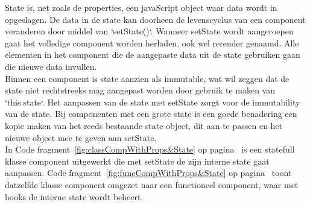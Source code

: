 State is, net zoals de properties, een javaScript object waar data wordt in opgeslagen. De data in de state kan doorheen de levenscyclus van een component veranderen door middel van `setState()`. Wanneer setState wordt aangeroepen gaat het volledige component worden herladen, ook wel rerender genaamd. Alle elementen in het component die de aangepaste data uit de state gebruiken gaan die nieuwe data invullen.\\
Binnen een component is state aanzien als immutable, wat wil zeggen dat de state niet rechtstreeks mag aangepast worden door gebruik te maken van `this.state`. Het aanpassen van de state met setState zorgt voor de immutability van de state. Bij componenten met een grote state is een goede benadering een kopie maken van het reeds bestaande state object, dit aan te passen en het nieuwe object mee te geven aan setState.\\
In Code fragment~\ref{fig:classCompWithProps&State} op pagina~\pageref{fig:classCompWithProps&State} is een statefull klasse component uitgewerkt die met setState de zijn interne state gaat aanpassen. Code fragment~\ref{fig:funcCompWithProps&State} op pagina~\pageref{fig:funcCompWithProps&State} toont datzelfde klasse component omgezet naar een functioneel component, waar met hooks de interne state wordt beheert.\\

